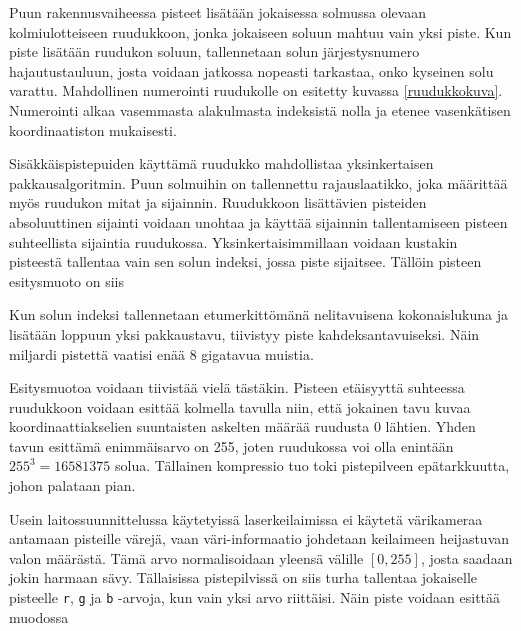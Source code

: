 Puun rakennusvaiheessa pisteet lisätään jokaisessa solmussa olevaan kolmiulotteiseen ruudukkoon, jonka jokaiseen soluun mahtuu vain yksi piste. Kun piste lisätään ruudukon soluun, tallennetaan solun järjestysnumero hajautustauluun, josta voidaan jatkossa nopeasti tarkastaa, onko kyseinen solu varattu. Mahdollinen numerointi ruudukolle on esitetty kuvassa \ref{ruudukkokuva}. Numerointi alkaa vasemmasta alakulmasta indeksistä nolla ja etenee vasenkätisen koordinaatiston mukaisesti. 

Sisäkkäispistepuiden käyttämä ruudukko mahdollistaa yksinkertaisen pakkausalgoritmin. Puun solmuihin on tallennettu rajauslaatikko, joka määrittää myös ruudukon mitat ja sijainnin. Ruudukkoon lisättävien pisteiden absoluuttinen sijainti voidaan unohtaa ja käyttää sijainnin tallentamiseen pisteen suhteellista sijaintia ruudukossa. Yksinkertaisimmillaan voidaan kustakin pisteestä tallentaa vain sen solun indeksi, jossa piste sijaitsee. Tällöin pisteen esitysmuoto on siis


\noindent Kun solun indeksi tallennetaan etumerkittömänä nelitavuisena kokonaislukuna ja lisätään loppuun yksi pakkaustavu, tiivistyy piste kahdeksantavuiseksi. Näin miljardi pistettä vaatisi enää 8 gigatavua muistia. 

Esitysmuotoa voidaan tiivistää vielä tästäkin. Pisteen etäisyyttä suhteessa ruudukkoon voidaan esittää kolmella tavulla niin, että jokainen tavu kuvaa koordinaattiakselien suuntaisten askelten määrää ruudusta 0 lähtien. Yhden tavun esittämä enimmäisarvo on 255, joten ruudukossa voi olla enintään $255^3=16581375$ solua. Tällainen kompressio tuo toki pistepilveen epätarkkuutta, johon palataan pian.

Usein laitossuunnittelussa käytetyissä laserkeilaimissa ei käytetä värikameraa antamaan pisteille värejä, vaan väri-informaatio johdetaan keilaimeen heijastuvan valon määrästä. Tämä arvo normalisoidaan yleensä välille $[0,255]$, josta saadaan jokin harmaan sävy. Tällaisissa pistepilvissä on siis turha tallentaa jokaiselle pisteelle \texttt{r}, \texttt{g} ja \texttt{b} -arvoja, kun vain yksi arvo riittäisi. Näin piste voidaan esittää muodossa 


